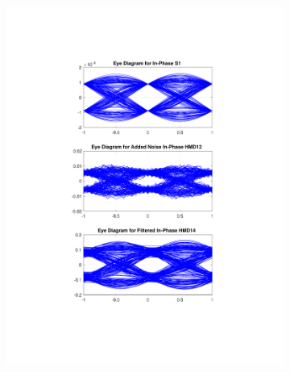 \begin{figure}[H]
	\centering
	\begin{subfigure}{.45\textwidth}
		\centering
		\includegraphics[clip, trim=5cm 4cm 5cm 4cm, width=\textwidth]{./sdf/m_qam_system/figures/eyes/if_n_p_45_03_rc.pdf}
	\end{subfigure}
	\begin{subfigure}{.45\textwidth}
		\centering

\end{subfigure}
\end{figure}
